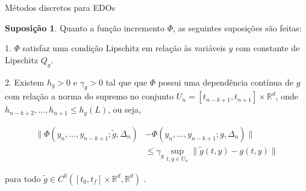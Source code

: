 \documentclass{beamer}
\newcommand{\R}{\mathbb{R}}
\theoremstyle{plain}
\theoremstyle{definition}
\newtheorem{assumption}{Suposição}
\begin{document}

\begin{frame}{Métodos discretos para EDOs}
    \begin{assumption}
        \label{chap3:assumption:1:Phi}
        \small
        Quanto a função incremento $\Phi$, as seguintes suposições são feitas:

        \phantom{aa} 1. $\Phi$ satisfaz uma condição Lipschitz em relação às variáveis $y$ com constante de Lipschitz $Q_g$.


        \phantom{aa} 2. Existem $h_g>0$ e $\gamma_g > 0$  tal que que $\Phi$ possui uma dependência contínua de $g$ com relação a norma do supremo no conjunto $U_n = [t_{n-k+1}, t_{n+1}] \times \R^d$, onde $h_{n - k +2 }, \dots, h_{n+1} \leq h_g (L)$, ou seja, 

        \scriptsize
            \begin{equation}
                \begin{split}
                    \| \Phi(y_n, ..., y_{n - k + 1}; \tilde{g}, \Delta_n)  &- \Phi(y_n, ..., y_{n - k + 1}; g, \Delta_n) \| \\
                                                                           &\leq \gamma_g \sup_{t, y \in U_n} \| \tilde{g}(t, y) - g(t, y) \|
                \end{split}
                \label{chap3:assumption:point_lipschitz_Phi}
            \end{equation}

        para todo $\tilde{g} \in C^0([t_0, t_f] \times \R^d, \R^d)$ . 

    \end{assumption}

\end{frame}



\end{document}
